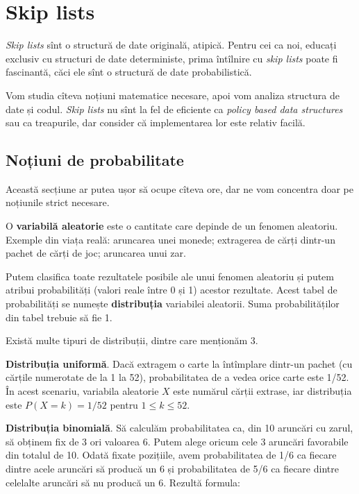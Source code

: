 \documentclass[../main.tex]{subfiles}
\begin{document}
\chapter{Skip lists}

\textit{Skip lists} sînt o structură de date originală, atipică. Pentru cei ca noi, educați exclusiv cu structuri de date deterministe, prima întîlnire cu \textit{skip lists} poate fi fascinantă, căci ele sînt o structură de date probabilistică.

Vom studia cîteva noțiuni matematice necesare, apoi vom analiza structura de date și codul. \textit{Skip lists} nu sînt la fel de eficiente ca \textit{policy based data structures} sau ca treapurile, dar consider că implementarea lor este relativ facilă.


\section{Noțiuni de probabilitate}

Această secțiune ar putea ușor să ocupe cîteva ore, dar ne vom concentra doar pe noțiunile strict necesare.

O \textbf{variabilă aleatorie} este o cantitate care depinde de un fenomen aleatoriu. Exemple din viața reală: aruncarea unei monede; extragerea de cărți dintr-un pachet de cărți de joc; aruncarea unui zar.

Putem clasifica toate rezultatele posibile ale unui fenomen aleatoriu și putem atribui probabilități (valori reale între 0 și 1) acestor rezultate. Acest tabel de probabilități se numește \textbf{distribuția} variabilei aleatorii. Suma probabilităților din tabel trebuie să fie 1.

Există multe tipuri de distribuții, dintre care menționăm 3.

\textbf{Distribuția uniformă}. Dacă extragem o carte la întîmplare dintr-un pachet (cu cărțile numerotate de la 1 la 52), probabilitatea de a vedea orice carte este 1/52. În acest scenariu, variabila aleatorie $X$ este numărul cărții extrase, iar distribuția este $P(X = k) = 1/52$ pentru $1 \leq k \leq 52$.

\textbf{Distribuția binomială}. Să calculăm probabilitatea ca, din 10 aruncări cu zarul, să obținem fix de 3 ori valoarea 6. Putem alege oricum cele 3 aruncări favorabile din totalul de 10. Odată fixate pozițiile, avem probabilitatea de 1/6 ca fiecare dintre acele aruncări să producă un 6 și probabilitatea de 5/6 ca fiecare dintre celelalte aruncări să nu producă un 6. Rezultă formula:
\end{document}
